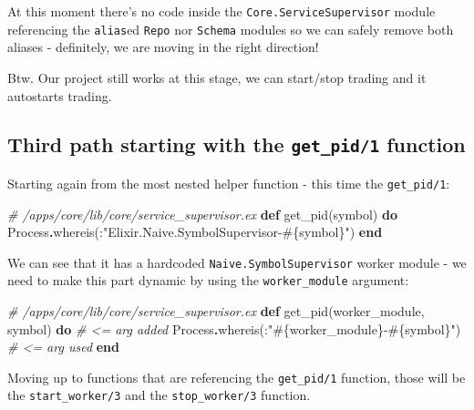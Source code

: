 \documentclass[
  oneside]{book}
\newenvironment{Shaded}{\begin{snugshade}}{\end{snugshade}}
\newcommand{\CommentTok}[1]{\textcolor[rgb]{0.56,0.35,0.01}{\textit{#1}}}
\newcommand{\ConstantTok}[1]{\textcolor[rgb]{0.00,0.00,0.00}{#1}}
\newcommand{\KeywordTok}[1]{\textcolor[rgb]{0.13,0.29,0.53}{\textbf{#1}}}
\newcommand{\NormalTok}[1]{#1}
\newcommand{\OperatorTok}[1]{\textcolor[rgb]{0.81,0.36,0.00}{\textbf{#1}}}
\newcommand{\OtherTok}[1]{\textcolor[rgb]{0.56,0.35,0.01}{#1}}
\newcommand{\StringTok}[1]{\textcolor[rgb]{0.31,0.60,0.02}{#1}}
\begin{document}
At this moment there's no code inside the \texttt{Core.ServiceSupervisor} module referencing the \texttt{alias}ed \texttt{Repo} nor \texttt{Schema} modules so we can safely remove both aliases - definitely, we are moving in the right direction!

Btw. Our project still works at this stage, we can start/stop trading and it autostarts trading.

\hypertarget{third-path-starting-with-the-get_pid1-function}{%
\subsection{\texorpdfstring{Third path starting with the \texttt{get\_pid/1} function}{Third path starting with the get\_pid/1 function}}\label{third-path-starting-with-the-get_pid1-function}}

Starting again from the most nested helper function - this time the \texttt{get\_pid/1}:

\begin{Shaded}
\begin{Highlighting}[]
  \CommentTok{\# /apps/core/lib/core/service\_supervisor.ex}
  \KeywordTok{def}\NormalTok{ get\_pid(symbol) }\KeywordTok{do}
    \ConstantTok{Process}\OperatorTok{.}\NormalTok{whereis(:}\StringTok{"Elixir.Naive.SymbolSupervisor{-}}\OtherTok{\#\{}\NormalTok{symbol}\OtherTok{\}}\StringTok{"}\NormalTok{)}
  \KeywordTok{end}  
\end{Highlighting}
\end{Shaded}

We can see that it has a hardcoded \texttt{Naive.SymbolSupervisor} worker module - we need to make this part dynamic by using the \texttt{worker\_module} argument:

\begin{Shaded}
\begin{Highlighting}[]
  \CommentTok{\# /apps/core/lib/core/service\_supervisor.ex}
  \KeywordTok{def}\NormalTok{ get\_pid(worker\_module, symbol) }\KeywordTok{do}  \CommentTok{\# \textless{}= arg added}
    \ConstantTok{Process}\OperatorTok{.}\NormalTok{whereis(:}\StringTok{"}\OtherTok{\#\{}\NormalTok{worker\_module}\OtherTok{\}}\StringTok{{-}}\OtherTok{\#\{}\NormalTok{symbol}\OtherTok{\}}\StringTok{"}\NormalTok{) }\CommentTok{\# \textless{}= arg used}
  \KeywordTok{end}
\end{Highlighting}
\end{Shaded}

Moving up to functions that are referencing the \texttt{get\_pid/1} function, those will be the \texttt{start\_worker/3} and the \texttt{stop\_worker/3} function.
\end{document}
